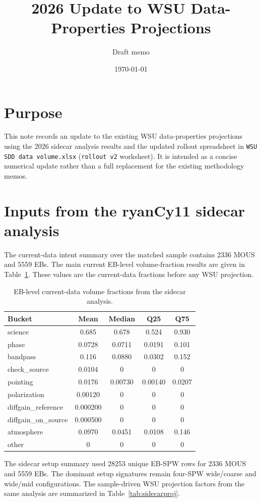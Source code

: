 \documentclass[11pt]{article}
\title{2026 Update to WSU Data-Properties Projections}
\author{Draft memo}
\date{\today}
\begin{document}
\maketitle

\section{Purpose}
This note records an update to the existing WSU data-properties projections using
the 2026 sidecar analysis results and the updated rollout spreadsheet in
\texttt{WSU SDD data volume.xlsx} (\texttt{rollout v2} worksheet).  It is
intended as a concise numerical update rather than a full replacement for the
existing methodology memos.

\section{Inputs from the ryanCy11 sidecar analysis}
The current-data intent summary over the matched sample contains 2336 MOUS and
5559 EBs.  The main current EB-level volume-fraction results are given in
Table~\ref{tab:ebfrac}.  These values are the current-data fractions before any
WSU projection.

\begin{table}[h]
\centering
\caption{EB-level current-data volume fractions from the sidecar analysis.}
\label{tab:ebfrac}
\begin{tabular}{lcccc}
\toprule
Bucket & Mean & Median & Q25 & Q75 \\
\midrule
science & 0.685 & 0.678 & 0.524 & 0.930 \\
phase & 0.0728 & 0.0711 & 0.0191 & 0.101 \\
bandpass & 0.116 & 0.0880 & 0.0302 & 0.152 \\
check\_source & 0.0104 & 0 & 0 & 0 \\
pointing & 0.0176 & 0.00730 & 0.00140 & 0.0207 \\
polarization & 0.00120 & 0 & 0 & 0 \\
diffgain\_reference & 0.000200 & 0 & 0 & 0 \\
diffgain\_on\_source & 0.000500 & 0 & 0 & 0 \\
atmosphere & 0.0970 & 0.0451 & 0.0108 & 0.146 \\
other & 0 & 0 & 0 & 0 \\
\bottomrule
\end{tabular}
\end{table}

The sidecar setup summary used 28253 unique EB-SPW rows for 2336 MOUS and 5559
EBs.  The dominant setup signatures remain four-SPW wide/coarse and wide/mid
configurations.  The sample-driven WSU projection factors from the same
analysis are summarized in Table~\ref{tab:sidecarproj}.
\end{document}
